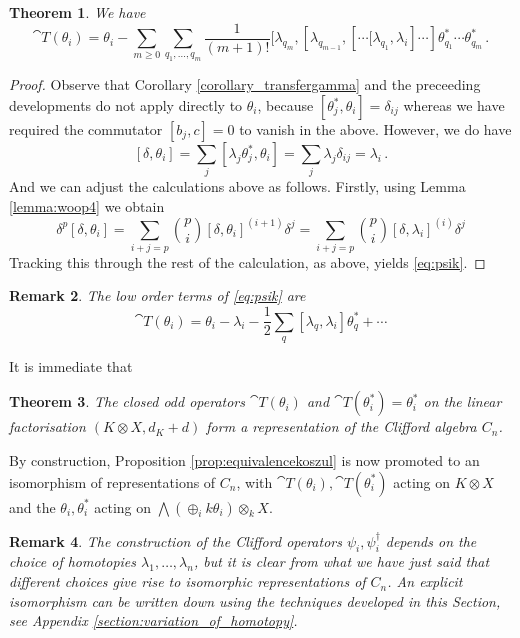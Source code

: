 \documentclass[english,letter paper,12pt,leqno]{article}
\newtheorem{theorem}{Theorem}[section]
\theoremstyle{example}
\newtheorem{remark}[theorem]{Remark}
\numberwithin{equation}{section}
\def\be{\begin{equation}}
\def\ee{\end{equation}}
\begin{document}
\begin{theorem}\label{theorem:psik} We have
\begin{equation}\label{eq:psik}
\cat{T}(\theta_i) = \theta_i - \sum_{m \ge 0} \sum_{q_1,\ldots,q_m} \frac{1}{(m+1)!} [ \lambda_{q_m}, [ \lambda_{q_{m-1}}, [ \cdots \big[ \lambda_{q_1}, \lambda_i ] \cdots ] \theta_{q_1}^* \cdots \theta_{q_m}^*\,.
\end{equation}
\end{theorem}
\begin{proof}
Observe that Corollary \ref{corollary_transfergamma} and the preceeding developments do not apply directly to $\theta_i$, because $[ \theta_j^*, \theta_i ] = \delta_{ij}$ whereas we have required the commutator $[b_j,c] = 0$ to vanish in the above. However, we do have
\[
[ \delta, \theta_i ] = \sum_j [ \lambda_j \theta_j^*, \theta_i ] = \sum_j \lambda_j \delta_{ij} = \lambda_i\,.
\]
And we can adjust the calculations above as follows. Firstly, using Lemma \ref{lemma:woop4} we obtain
\[
\delta^p [\delta, \theta_i] = \sum_{i+j=p} \binom{p}{i} [\delta, \theta_i]^{(i+1)} \delta^j = \sum_{i+j=p} \binom{p}{i} [\delta, \lambda_i]^{(i)} \delta^j
\]
Tracking this through the rest of the calculation, as above, yields \eqref{eq:psik}.
\end{proof}

\begin{remark} The low order terms of \eqref{eq:psik} are
\be
\cat{T}(\theta_i) = \theta_i - \lambda_i - \frac{1}{2} \sum_q [\lambda_q, \lambda_i] \theta^*_q + \cdots
\ee
\end{remark}

It is immediate that

\begin{theorem} The closed odd operators $\cat{T}(\theta_i)$ and $\cat{T}(\theta_i^*) = \theta_i^*$ on the linear factorisation $(K \otimes X, d_K + d)$ form a representation of the Clifford algebra $C_n$.
\end{theorem}

By construction, Proposition \ref{prop:equivalencekoszul} is now promoted to an isomorphism of representations of $C_n$, with $\cat{T}(\theta_i), \cat{T}(\theta_i^*)$ acting on $K \otimes X$ and the $\theta_i, \theta_i^*$ acting on $\bigwedge( \oplus_i k\theta_i ) \otimes_k X$. 

\begin{remark} The construction of the Clifford operators $\psi_i, \psi_i^\dagger$ depends on the choice of homotopies $\lambda_1,\ldots,\lambda_n$, but it is clear from what we have just said that different choices give rise to isomorphic representations of $C_n$. An explicit isomorphism can be written down using the techniques developed in this Section, see Appendix \ref{section:variation_of_homotopy}.
\end{remark}
\end{document}
